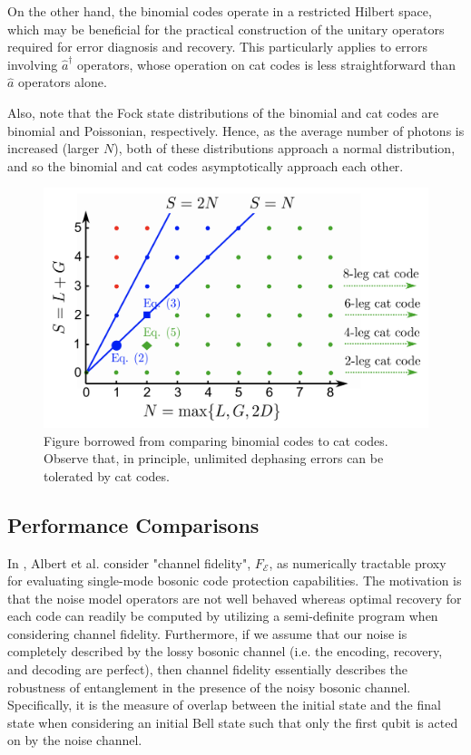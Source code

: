 \documentclass[12]{amsart}
\newcommand\0{\mathbf{0}}
\newcommand\<{\langle}
\renewcommand\>{\rangle}
\begin{document}
On the other hand, the binomial codes operate in a restricted Hilbert space, which may be beneficial for the practical construction of the unitary operators required for error diagnosis and recovery. This particularly applies to errors involving $\hat{a}^\dag$ operators, whose operation on cat codes is less straightforward than $\hat{a}$ operators alone.

Also, note that the Fock state distributions of the binomial and cat codes are binomial and Poissonian, respectively. Hence, as the average number of photons is increased (larger $N$), both of these distributions approach a normal distribution, and so the binomial and cat codes asymptotically approach each other. 

\begin{figure}
\centering
\includegraphics[width=0.5\linewidth,keepaspectratio]{binom_cat.png}	
\caption{Figure borrowed from \cite{michael2016new} comparing binomial codes to cat codes. Observe that, in principle, unlimited dephasing errors can be tolerated by cat codes.}
\end{figure}

\subsection{Performance Comparisons}
\label{sec:perf}

In \cite{albert2017performance}, Albert et al. consider "channel fidelity", $F_\mathcal{E}$,  as numerically tractable proxy for evaluating single-mode bosonic code protection capabilities. The motivation is that the noise model operators are not well behaved whereas optimal recovery for each code can readily be computed by utilizing a semi-definite program when considering channel fidelity. Furthermore, if we assume that our noise is completely described by the lossy bosonic channel (i.e. the encoding, recovery, and decoding are perfect), then channel fidelity essentially describes the robustness of entanglement in the presence of the noisy bosonic channel. Specifically, it is the measure of overlap between the initial state and the final state when considering an initial Bell state such that only the first qubit is acted on by the noise channel.
\end{document}
